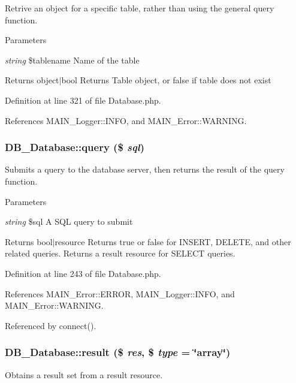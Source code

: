 Retrive an object for a specific table, rather than using the general query function.


\begin{DoxyParams}{Parameters}
\item[{\em string}]\$tablename Name of the table\end{DoxyParams}
\begin{DoxyReturn}{Returns}
object$|$bool Returns Table object, or false if table does not exist 
\end{DoxyReturn}


Definition at line 321 of file Database.php.

References MAIN\_\-Logger::INFO, and MAIN\_\-Error::WARNING.\hypertarget{classDB__Database_a67786f5c272e27980edf76a57fc16902}{
\subsubsection[{query}]{\setlength{\rightskip}{0pt plus 5cm}DB\_\-Database::query (\$ {\em sql})}}
\label{d3/d63/classDB__Database_a67786f5c272e27980edf76a57fc16902}
Submits a query to the database server, then returns the result of the query function.


\begin{DoxyParams}{Parameters}
\item[{\em string}]\$sql A SQL query to submit\end{DoxyParams}
\begin{DoxyReturn}{Returns}
bool$|$resource Returns true or false for INSERT, DELETE, and other related queries. Returns a result resource for SELECT queries. 
\end{DoxyReturn}


Definition at line 243 of file Database.php.

References MAIN\_\-Error::ERROR, MAIN\_\-Logger::INFO, and MAIN\_\-Error::WARNING.

Referenced by connect().\hypertarget{classDB__Database_a2739adb306d170f19c0e87a61a2bfc05}{
\subsubsection[{result}]{\setlength{\rightskip}{0pt plus 5cm}DB\_\-Database::result (\$ {\em res}, \/  \$ {\em type} = {\ttfamily \char`\"{}array\char`\"{}})}}
\label{d3/d63/classDB__Database_a2739adb306d170f19c0e87a61a2bfc05}
Obtains a result set from a result resource.


